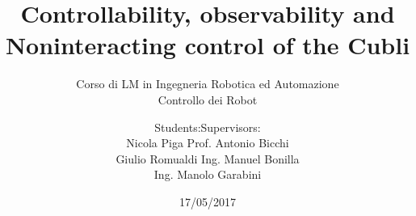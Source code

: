 \documentclass{beamer}
\date{17/05/2017}
\title[]{Controllability, observability and Noninteracting control of the Cubli}
\subtitle{Corso di LM in Ingegneria Robotica ed Automazione \\
  Controllo dei Robot}
\author{Students:\hfill Supervisors:\\
Nicola Piga \hfill Prof. Antonio Bicchi\\
Giulio Romualdi \hfill Ing. Manuel Bonilla\\
\hphantom{placeholder}\hfill Ing. Manolo Garabini}
\institute[]{Università di Pisa}
\begin{document}

\begin{frame}
  \maketitle
\end{frame}






\end{document}
